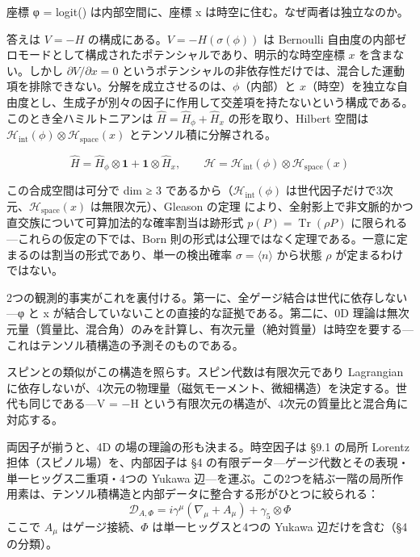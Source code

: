 \documentclass[fontsize=11pt,paper=a4,lualatex]{jlreq}
\begin{document}
座標 φ = logit(\sigma) は内部空間に、座標 x
は時空に住む。なぜ両者は独立なのか。

答えは $V = -H$ の構成にある。$V = -H(\sigma(\phi))$ は Bernoulli 自由度の内部ゼロモードとして構成されたポテンシャルであり、明示的な時空座標 $x$ を含まない。しかし $\partial V/\partial x = 0$ というポテンシャルの非依存性だけでは、混合した運動項を排除できない。分解を成立させるのは、$\phi$（内部）と $x$（時空）を独立な自由度とし、生成子が別々の因子に作用して交差項を持たないという構成である。このとき全ハミルトニアンは $\hat{H} = \hat{H}_\phi + \hat{H}_x$ の形を取り、Hilbert 空間は $\mathcal{H}_\mathrm{int}(\phi) \otimes \mathcal{H}_\mathrm{space}(x)$ とテンソル積に分解される。

\[\hat{H} = \hat{H}_\phi \otimes \mathbf{1} + \mathbf{1} \otimes \hat{H}_x,\qquad \mathcal{H} = \mathcal{H}_\mathrm{int}(\phi) \otimes \mathcal{H}_\mathrm{space}(x)\]

この合成空間は可分で dim ≥ 3 であるから（$\mathcal{H}_\mathrm{int}(\phi)$ は世代因子だけで3次元、$\mathcal{H}_\mathrm{space}(x)$ は無限次元）、Gleason の定理 \cite{gleason} により、全射影上で非文脈的かつ直交族について可算加法的な確率割当は跡形式 $p(P) = \operatorname{Tr}(\rho P)$ に限られる---これらの仮定の下では、Born 則の形式は公理ではなく定理である。一意に定まるのは割当の形式であり、単一の検出確率 $\sigma = \langle n \rangle$ から状態 $\rho$ が定まるわけではない。

2つの観測的事実がこれを裏付ける。第一に、全ゲージ結合は世代に依存しない---φ
と x が結合していないことの直接的な証拠である。第二に、0D
理論は無次元量（質量比、混合角）のみを計算し、有次元量（絶対質量）は時空を要する---これはテンソル積構造の予測そのものである。

スピンとの類似がこの構造を照らす。スピン代数は有限次元であり Lagrangian
に依存しないが、4次元の物理量（磁気モーメント、微細構造）を決定する。世代も同じである---V
= −H という有限次元の構造が、4次元の質量比と混合角に対応する。

両因子が揃うと、4D の場の理論の形も決まる。時空因子は §9.1 の局所 Lorentz 担体（スピノル場）を、内部因子は §4 の有限データ---ゲージ代数とその表現・単一ヒッグス二重項・4つの Yukawa 辺---を運ぶ。この2つを結ぶ一階の局所作用素は、テンソル積構造と内部データに整合する形がひとつに絞られる：
\begin{equation}
\mathcal{D}_{A,\Phi} = i\gamma^\mu(\nabla_\mu + A_\mu) + \gamma_5 \otimes \Phi
\end{equation}
ここで $A_\mu$ はゲージ接続、$\Phi$ は単一ヒッグスと4つの Yukawa 辺だけを含む（§4 の分類）。
\end{document}
